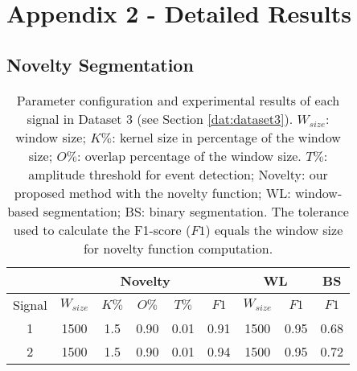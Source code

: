 
%

\chapter{Appendix 2 - Detailed Results}
\label{appendix:tables_detailed}

\section{Novelty Segmentation}


\begin{table}[H]
    \caption{Parameter configuration and experimental results of each signal in Dataset 3 (see Section \ref{dat:dataset3}). $W_{size}$: window size; $K\%$: kernel size in percentage of the window size; $O\%$: overlap percentage of the window size. $T\%$: amplitude threshold for event detection; Novelty: our proposed method with the novelty function; WL: window-based segmentation; BS: binary segmentation. The tolerance used to calculate the F1-score ($F1$) equals the window size for novelty function computation.}
    \label{tab:params_results_1}
    \centering
    \begin{tabular}{ccccccccc}
    \toprule
    & \multicolumn{5}{c}{Novelty} & \multicolumn{2}{c}{WL} & BS\\
    \midrule
    Signal &     $W_{size}$ &     $K\%$ &     $O\%$ &   $T\%$    &     $F1$ & $W_{size}$ & $F1$ & $F1$\\
    \cmidrule(lr){2-6} \cmidrule(lr){7-8} \cmidrule(lr){9-9}
    1 & 1500 & 1.5 & 0.90 & 0.01 & 0.91 & 1500 & 0.95 & 0.68 \\
    2 & 1500 & 1.5 & 0.90 & 0.01 & 0.94 & 1500 & 0.95 & 0.72 \\
    \bottomrule
    \end{tabular}
\end{table}
    
